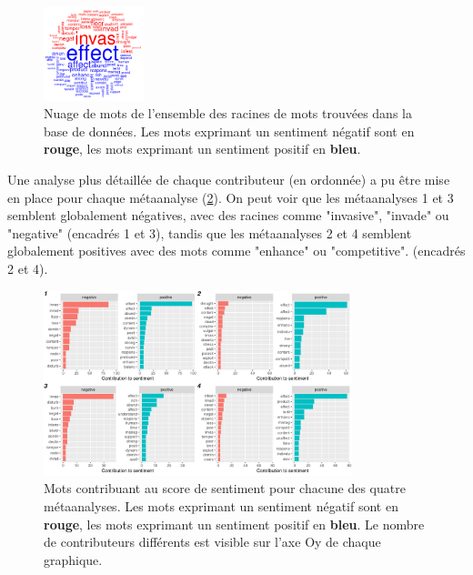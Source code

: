 \documentclass{book}
\begin{document}
\begin{figure}[htb] %
    \begin{center} %
        \includegraphics[width=0.26\textwidth]{senti_cloud_all.png}
        \caption{Nuage de mots de l'ensemble des racines de mots trouvées dans la base de données. Les mots exprimant un sentiment négatif sont en \textbf{rouge}, les mots exprimant un sentiment positif en \textbf{bleu}.\label{senti_cloud_all}}
    \end{center}  
\end{figure}

Une analyse plus détaillée de chaque contributeur (en ordonnée) a pu être mise en place pour chaque métaanalyse (\cref{senti_contri_each}). On peut voir que les métaanalyses 1 et 3 semblent globalement négatives, avec des racines comme "invasive", "invade" ou "negative" (encadrés 1 et 3), tandis que les métaanalyses 2 et 4 semblent globalement positives avec des mots comme "enhance" ou "competitive".  (encadrés 2 et 4).

\begin{figure}[htb] %
    \begin{center} %
        \includegraphics[width=0.8\textwidth]{senti_contri_each.png}
        \caption{Mots contribuant au score de sentiment pour chacune des quatre métaanalyses. Les mots exprimant un sentiment négatif sont en \textbf{rouge}, les mots exprimant un sentiment positif en \textbf{bleu}. Le nombre de contributeurs différents est visible sur l'axe Oy de chaque graphique.\label{senti_contri_each}}
    \end{center}  
\end{figure}
\FloatBarrier
\end{document}

